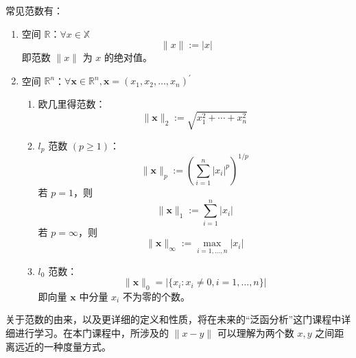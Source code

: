 \documentclass[cn]{elegantpaper}
\begin{document}
\begin{example}[常见范数]
    常见范数有：
    \begin{enumerate}
        \item 空间 $\mathbb{R}$：$\forall x\in\mathbb{X}$
              \begin{equation}
                  \|x\|:=|x|
              \end{equation}
              即范数 $\|x\|$ 为 $x$ 的绝对值。
        \item 空间 $\mathbb{R}^{n}$：$\forall\mathbf{x}\in\mathbb{R}^{n}, \mathbf{x}=(x_{1},x_{2},\ldots,x_{n})^{\prime}$
              \begin{enumerate}
                  \item 欧几里得范数：
                        \begin{equation}
                            \|\mathbf{x}\|_{2}:=\sqrt{x_{1}^{2}+\cdots+x_{n}^{2}}
                        \end{equation}
                  \item  $l_{p}$ 范数 $(p\geq 1)$：
                        \begin{equation}
                            \|\mathbf{x}\|_{p}:=\left(\sum_{i=1}^{n}\left|x_{i}\right|^{p}\right)^{1/p}
                        \end{equation}
                        若 $p=1$，则
                        \begin{equation}
                            \|\mathbf{x}\|_{1}:=\sum_{i=1}^{n}|x_{i}|
                        \end{equation}
                        若 $p=\infty$，则
                        \begin{equation}
                            \|\mathbf{x}\|_{\infty}:=\max_{i=1,\ldots,n}|x_{i}|
                        \end{equation}
                  \item  $l_{0}$ 范数：
                        \begin{equation}
                            \|\mathbf{x}\|_{0}=|\{x_{i}:x_{i}\neq 0,i=1,\ldots,n\}|
                        \end{equation}
                        即向量 $\mathbf{x}$ 中分量 $x_{i}$ 不为零的个数。
              \end{enumerate}
    \end{enumerate}
\end{example}

\begin{remark}
    关于范数的由来，以及更详细的定义和性质，将在未来的“泛函分析”这门课程中详细进行学习。在本门课程中，所涉及的 $\|x-y\|$ 可以理解为两个数 $x,y$ 之间距离远近的一种度量方式。
\end{remark}
\end{document}
